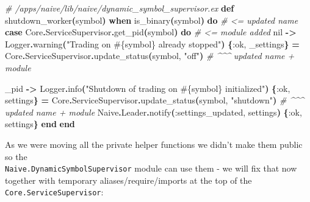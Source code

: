 \documentclass[
  oneside]{book}
\newenvironment{Shaded}{\begin{snugshade}}{\end{snugshade}}
\newcommand{\CommentTok}[1]{\textcolor[rgb]{0.56,0.35,0.01}{\textit{#1}}}
\newcommand{\ConstantTok}[1]{\textcolor[rgb]{0.56,0.35,0.01}{#1}}
\newcommand{\FunctionTok}[1]{\textcolor[rgb]{0.13,0.29,0.53}{\textbf{#1}}}
\newcommand{\KeywordTok}[1]{\textcolor[rgb]{0.13,0.29,0.53}{\textbf{#1}}}
\newcommand{\NormalTok}[1]{#1}
\newcommand{\OperatorTok}[1]{\textcolor[rgb]{0.81,0.36,0.00}{\textbf{#1}}}
\newcommand{\OtherTok}[1]{\textcolor[rgb]{0.56,0.35,0.01}{#1}}
\newcommand{\StringTok}[1]{\textcolor[rgb]{0.31,0.60,0.02}{#1}}
\newcommand{\VariableTok}[1]{\textcolor[rgb]{0.00,0.00,0.00}{#1}}
\begin{document}
\begin{Shaded}
\begin{Highlighting}[]
  \CommentTok{\# /apps/naive/lib/naive/dynamic\_symbol\_supervisor.ex}
  \KeywordTok{def}\NormalTok{ shutdown\_worker}\FunctionTok{(}\NormalTok{symbol}\FunctionTok{)} \KeywordTok{when}\NormalTok{ is\_binary}\FunctionTok{(}\NormalTok{symbol}\FunctionTok{)} \KeywordTok{do} \CommentTok{\# \textless{}= updated name}
    \KeywordTok{case} \ConstantTok{Core}\OperatorTok{.}\ConstantTok{ServiceSupervisor}\OperatorTok{.}\NormalTok{get\_pid}\FunctionTok{(}\NormalTok{symbol}\FunctionTok{)} \KeywordTok{do}      \CommentTok{\# \textless{}= module added}
      \ConstantTok{nil} \OperatorTok{{-}\textgreater{}}
        \ConstantTok{Logger}\OperatorTok{.}\NormalTok{warning}\FunctionTok{(}\StringTok{"Trading on }\OtherTok{\#\{}\NormalTok{symbol}\OtherTok{\}}\StringTok{ already stopped"}\FunctionTok{)}
        \FunctionTok{\{}\VariableTok{:ok}\NormalTok{, \_settings}\FunctionTok{\}} \OperatorTok{=} \ConstantTok{Core}\OperatorTok{.}\ConstantTok{ServiceSupervisor}\OperatorTok{.}\NormalTok{update\_status}\FunctionTok{(}\NormalTok{symbol, }\StringTok{"off"}\FunctionTok{)}
                                                \CommentTok{\# \^{}\^{}\^{} updated name + module}

\NormalTok{      \_pid }\OperatorTok{{-}\textgreater{}}
        \ConstantTok{Logger}\OperatorTok{.}\NormalTok{info}\FunctionTok{(}\StringTok{"Shutdown of trading on }\OtherTok{\#\{}\NormalTok{symbol}\OtherTok{\}}\StringTok{ initialized"}\FunctionTok{)}
        \FunctionTok{\{}\VariableTok{:ok}\NormalTok{, settings}\FunctionTok{\}} \OperatorTok{=} \ConstantTok{Core}\OperatorTok{.}\ConstantTok{ServiceSupervisor}\OperatorTok{.}\NormalTok{update\_status}\FunctionTok{(}\NormalTok{symbol, }\StringTok{"shutdown"}\FunctionTok{)}
                                                \CommentTok{\# \^{}\^{}\^{} updated name + module}
        \ConstantTok{Naive}\OperatorTok{.}\ConstantTok{Leader}\OperatorTok{.}\NormalTok{notify}\FunctionTok{(}\VariableTok{:settings\_updated}\NormalTok{, settings}\FunctionTok{)}
        \FunctionTok{\{}\VariableTok{:ok}\NormalTok{, settings}\FunctionTok{\}}
    \KeywordTok{end}
  \KeywordTok{end}
\end{Highlighting}
\end{Shaded}

As we were moving all the private helper functions we didn't make them public so the\\
\texttt{Naive.DynamicSymbolSupervisor} module can use them - we will fix that now together with temporary aliases/require/imports at the top of the \texttt{Core.ServiceSupervisor}:
\end{document}
